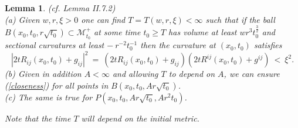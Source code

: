 \documentclass[12pt]{amsart}
\newcommand{\M}{{\mathcal M}}
\numberwithin{equation}{section}
\theoremstyle{plain}
\newtheorem{lemma}[equation]{Lemma}
\theoremstyle{definition}
\theoremstyle{remark}
\begin{document}
\begin{lemma} \label{lemII.7.2} (cf. Lemma II.7.2) \\
(a) Given $w, r, \xi > 0$ one can find $T = T(w,r,\xi) < \infty$ such that
if the ball $B(x_0, t_0, r \sqrt{t_0}) \subset \M_{t_0}^+$ at some time $t_0 \ge T$ has
volume at least $wr^3 t_0^{\frac32}$ and sectional curvatures at least
$- \: r^{-2} t_0^{-1}$ then the curvature at $(x_0, t_0)$
satisfies
\begin{equation} \label{closeness}
|2tR_{ij}(x_0, t_0) + g_{ij}|^2 \: = \: 
(2tR_{ij}(x_0, t_0) + g_{ij})(2tR^{ij}(x_0, t_0) + g^{ij}) \: < \: \xi^2.
\end{equation}
(b) Given in addition $A < \infty$ and allowing $T$ to depend on $A$, we
can ensure (\ref{closeness}) for all points in 
$B(x_0, t_0, Ar \sqrt{t_0})$. \\
(c) The same is true for $P(x_0, t_0, Ar \sqrt{t_0}, A r^2 t_0)$.

Note that the time $T$ will depend on the initial metric.
\end{lemma}
\end{document}

